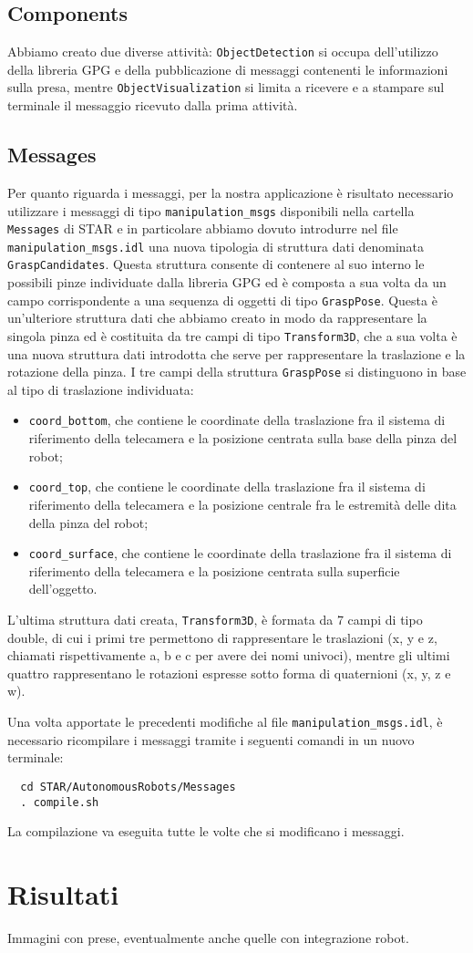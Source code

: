 \documentclass{report}
\begin{document}
\section{Components}
Abbiamo creato due diverse attività: \texttt{ObjectDetection} si occupa dell'utilizzo della libreria GPG e della pubblicazione di messaggi contenenti le informazioni sulla presa, mentre \texttt{ObjectVisualization} si limita a ricevere e a stampare sul terminale il messaggio ricevuto dalla prima attività.
\section{Messages}
Per quanto riguarda i messaggi, per la nostra applicazione è risultato necessario utilizzare i messaggi di tipo \texttt{manipulation\_msgs} disponibili nella cartella \texttt{Messages} di STAR e in particolare abbiamo dovuto introdurre nel file \texttt{manipulation\_msgs.idl} una nuova tipologia di struttura dati denominata \texttt{GraspCandidates}. Questa struttura consente di contenere al suo interno le possibili pinze individuate dalla libreria GPG ed è composta a sua volta da un campo corrispondente a una sequenza di oggetti di tipo \texttt{GraspPose}. Questa è un'ulteriore struttura dati che abbiamo creato in modo da rappresentare la singola pinza ed è costituita da tre campi di tipo \texttt{Transform3D}, che a sua volta è una nuova struttura dati introdotta che serve per rappresentare la traslazione e la rotazione della pinza. I tre campi della struttura \texttt{GraspPose} si distinguono in base al tipo di traslazione individuata:
\begin{itemize}
	\item \texttt{coord\_bottom}, che contiene le coordinate della traslazione fra il sistema di riferimento della telecamera e la posizione centrata sulla base della pinza del robot;
	\item \texttt{coord\_top}, che contiene le coordinate della traslazione fra il sistema di riferimento della telecamera e la posizione centrale fra le estremità delle dita della pinza del robot;
	\item \texttt{coord\_surface}, che contiene le coordinate della traslazione fra il sistema di riferimento della telecamera e la posizione centrata sulla superficie dell'oggetto.
\end{itemize}
L'ultima struttura dati creata, \texttt{Transform3D}, è formata da 7 campi di tipo double, di cui i primi tre permettono di rappresentare le traslazioni (x, y e z, chiamati rispettivamente a, b e c per avere dei nomi univoci), mentre gli ultimi quattro rappresentano le rotazioni espresse sotto forma di quaternioni (x, y, z e w). \par
Una volta apportate le precedenti modifiche al file \texttt{manipulation\_msgs.idl}, è necessario ricompilare i messaggi tramite i seguenti comandi in un nuovo terminale:
\begin{verbatim}
  cd STAR/AutonomousRobots/Messages
  . compile.sh
\end{verbatim}
La compilazione va eseguita tutte le volte che si modificano i messaggi.

\newpage
\chapter{Risultati}\label{risultati}
Immagini con prese, eventualmente anche quelle con integrazione robot.
\end{document}
